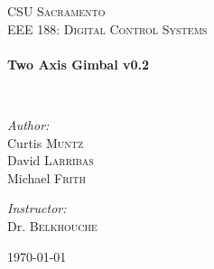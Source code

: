 \begin{titlepage}
\begin{center}


\textsc{\LARGE CSU Sacramento}\\[1.5cm]

\textsc{\Large EEE 188: Digital Control Systems}\\[0.5cm]

\HRule \\[0.4cm]
{ \huge \bfseries Two Axis Gimbal v0.2\\[0.4cm] }

\HRule \\[1.5cm]

\begin{minipage}{0.4\textwidth}
\begin{flushleft} \large
\emph{Author:}\\
Curtis \textsc{Muntz}\\
David \textsc{Larribas}\\
Michael \textsc{Frith}
\end{flushleft}
\end{minipage}
\begin{minipage}{0.4\textwidth}
\begin{flushright} \large
\emph{Instructor:} \\
Dr. \textsc{Belkhouche}
\end{flushright}
\end{minipage}

\vfill

{\large \today}

\end{center}
\end{titlepage}